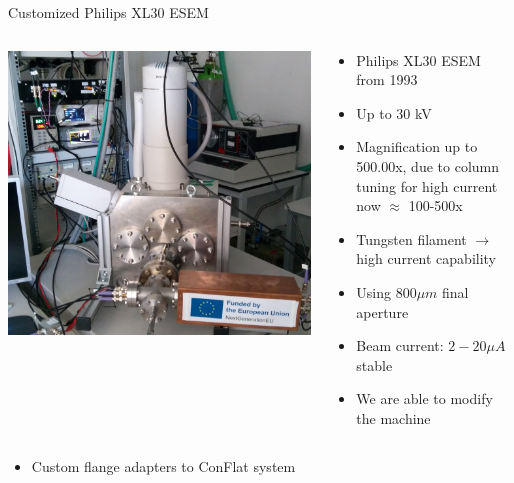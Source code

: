 \documentclass[final]{beamer}
\begin{document}
\begin{frame}[fragile]{}
\begin{columns}[T]
\begin{column}{.49\linewidth}
\begin{block}{\Large Customized Philips XL30 ESEM}
		\begin{columns}
			\begin{column}{0.45\columnwidth}
				\includegraphics[width=\columnwidth]{./figures/sematati2_2.png}
			\end{column}
			\begin{column}{0.45\columnwidth}
				\begin{itemize}
					\item Philips XL30 ESEM from 1993
					\item Up to 30 kV
					\item Magnification up to 500.00x, due to column tuning for high current now $\approx$ 100-500x
					\item Tungsten filament $\to$ high current capability
					\item Using $800 \mu m$ final aperture
					\item Beam current: $2 - 20 \mu A$ stable
					\item We are able to modify the machine
				\end{itemize}
			\end{column}
		\end{columns}
		\vspace{1cm}
		\begin{columns}
			\begin{column}{0.225\columnwidth}
				\begin{itemize}
					\item Custom flange adapters to ConFlat system

\end{itemize}
\end{column}
\end{columns}
\end{block}
\end{column}
\end{columns}
\end{frame}
\end{document}
